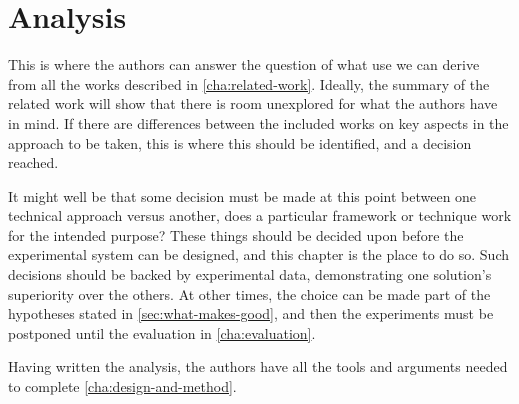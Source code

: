 \chapter{Analysis}
\label{cha:analysis}

This is where the authors can answer the question of what use we can derive
from all the works described in \autoref{cha:related-work}. Ideally, the
summary of the related work will show that there is room unexplored for what
the authors have in mind. If there are differences between the included
works on key aspects in the approach to be taken, this is where this should
be identified, and a decision reached.

It might well be that some decision must be made at this point between one
technical approach versus another, \eg does a particular framework or
technique work for the intended purpose?  These things should be decided
upon before the experimental system can be designed, and this chapter is the
place to do so. Such decisions should be backed by experimental data,
demonstrating one solution's superiority over the others. At other times,
the choice can be made part of the hypotheses stated in
\autoref{sec:what-makes-good}, and then the experiments must be postponed
until the evaluation in \autoref{cha:evaluation}.

Having written the analysis, the authors have all the tools and arguments
needed to complete \autoref{cha:design-and-method}.



